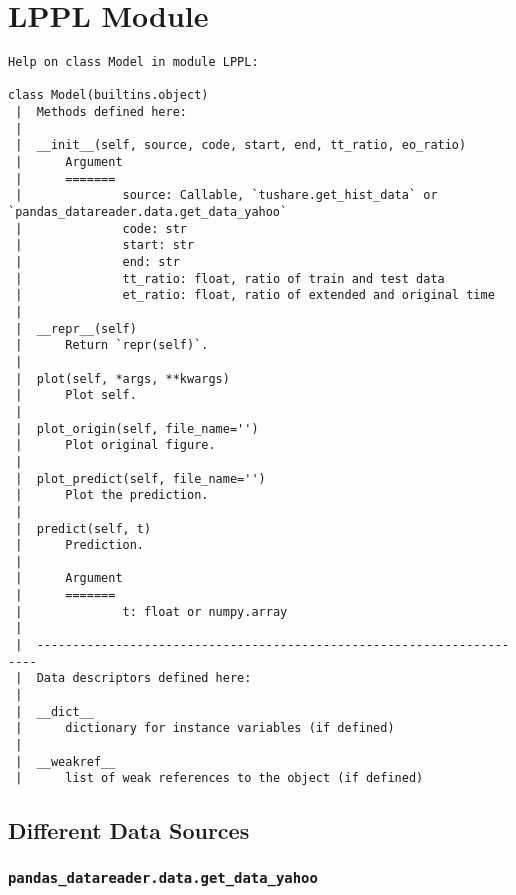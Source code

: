 \hypertarget{lppl-module}{%
\section{LPPL Module}\label{lppl-module}}

\begin{Shaded}
\begin{Highlighting}[]

\end{Highlighting}
\end{Shaded}

\begin{verbatim}
Help on class Model in module LPPL:

class Model(builtins.object)
 |  Methods defined here:
 |  
 |  __init__(self, source, code, start, end, tt_ratio, eo_ratio)
 |      Argument
 |      =======
 |              source: Callable, `tushare.get_hist_data` or                            `pandas_datareader.data.get_data_yahoo`
 |              code: str
 |              start: str
 |              end: str
 |              tt_ratio: float, ratio of train and test data
 |              et_ratio: float, ratio of extended and original time
 |  
 |  __repr__(self)
 |      Return `repr(self)`.
 |  
 |  plot(self, *args, **kwargs)
 |      Plot self.
 |  
 |  plot_origin(self, file_name='')
 |      Plot original figure.
 |  
 |  plot_predict(self, file_name='')
 |      Plot the prediction.
 |  
 |  predict(self, t)
 |      Prediction.
 |      
 |      Argument
 |      =======
 |              t: float or numpy.array
 |  
 |  ----------------------------------------------------------------------
 |  Data descriptors defined here:
 |  
 |  __dict__
 |      dictionary for instance variables (if defined)
 |  
 |  __weakref__
 |      list of weak references to the object (if defined)

\end{verbatim}

\hypertarget{different-data-sources}{%
\subsection{Different Data Sources}\label{different-data-sources}}

\hypertarget{pandas_datareaderdataget_data_yahoo}{%
\subsubsection{\texorpdfstring{\texttt{pandas\_datareader.data.get\_data\_yahoo}}{pandas\_datareader.data.get\_data\_yahoo}}\label{pandas_datareaderdataget_data_yahoo}}

